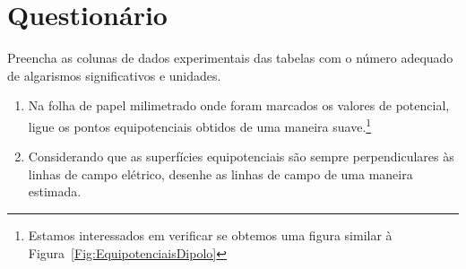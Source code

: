 \cleardoublepage


\vspace{15mm}

\begin{fullwidth}
\noindent{}
\vspace{5mm}

\noindent{}

\noindent{}

\noindent{}

\noindent{}

\noindent{}
\end{fullwidth}

\vspace{5mm}

\section{Questionário}

\begin{question}[type={exam}]
Preencha as colunas de dados experimentais das tabelas com o número adequado de algarismos significativos e unidades.
\end{question}

\begin{question}[type={exam}]
\begin{enumerate}[label=\roman*.]
    \item Na folha de papel milimetrado onde foram marcados os valores de potencial, ligue os pontos equipotenciais obtidos de uma maneira suave.\footnote{Estamos interessados em verificar se obtemos uma figura similar à Figura~\ref{Fig:EquipotenciaisDipolo}}
    \item Considerando que as superfícies equipotenciais são sempre perpendiculares às linhas de campo elétrico, desenhe as linhas de campo de uma maneira estimada.
\end{enumerate}
\end{question}

